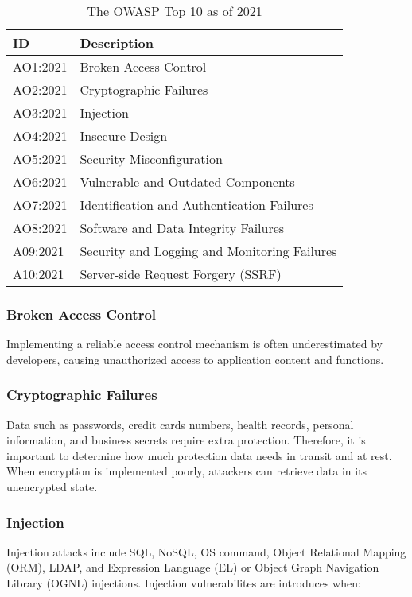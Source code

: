 \begin{table}
    \centering
    \caption{The OWASP Top 10 as of 2021}
    \label{tab:owasp-top-ten}
    \begin{tabulary}{1.0\textwidth}{|l|L|}
        \hline
        \textbf{ID} & \textbf{Description} \\
        \hline
        AO1:2021 & Broken Access Control \\
        \hline
        AO2:2021 & Cryptographic Failures \\
        \hline
        AO3:2021 & Injection \\
        \hline
        AO4:2021 & Insecure Design \\
        \hline
        AO5:2021 & Security Misconfiguration \\
        \hline
        AO6:2021 & Vulnerable and Outdated Components \\
        \hline
        AO7:2021 & Identification and Authentication Failures \\
        \hline
        AO8:2021 & Software and Data Integrity Failures \\
        \hline
        A09:2021 & Security and Logging and Monitoring Failures \\
        \hline
        A10:2021 & Server-side Request Forgery (SSRF) \\
        \hline 
    \end{tabulary}
\end{table}

\subsubsection{Broken Access Control}
Implementing a reliable access control mechanism is often underestimated by developers, causing unauthorized access to application content and functions.

\subsubsection{Cryptographic Failures}
Data such as passwords, credit cards numbers, health records, personal information, and business secrets require extra protection. Therefore, it is important to determine how much protection data needs in transit and at rest. When encryption is implemented poorly, attackers can retrieve data in its unencrypted state.

\subsubsection{Injection}
Injection attacks include SQL, NoSQL, OS command, Object Relational Mapping (ORM), LDAP, and Expression Language (EL) or Object Graph Navigation Library (OGNL) injections. Injection vulnerabilites are introduces when:

